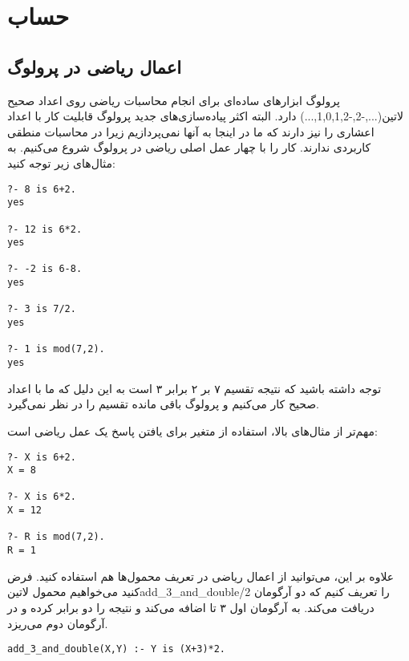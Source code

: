 \chapter{حساب}

\section{اعمال ریاضی در پرولوگ}

پرولوگ ابزارهای ساده‌ای برای انجام محاسبات ریاضی روی اعداد صحیح ‌لاتین{(...,-2,-1,0,1,2,...)} دارد. البته اکثر پیاده‌سازی‌های جدید پرولوگ قابلیت کار با اعداد اعشاری را نیز دارند که ما در اینجا به آنها نمی‌پردازیم زیرا در محاسبات منطقی کاربردی ندارند. کار را با چهار عمل اصلی ریاضی در پرولوگ شروع می‌کنیم. به مثال‌های زیر توجه کنید:

\begin{latin}
\begin{lstlisting}
?- 8 is 6+2.
yes

?- 12 is 6*2.
yes

?- -2 is 6-8.
yes

?- 3 is 7/2.
yes

?- 1 is mod(7,2).
yes
\end{lstlisting}
\end{latin}

توجه داشته باشید که نتیجه تقسیم ۷ بر ۲ برابر ۳ است به این دلیل که ما با اعداد صحیح کار می‌کنیم و پرولوگ باقی مانده تقسیم را در نظر نمی‌گیرد.

مهم‌تر از مثال‌های بالا، استفاده از متغیر برای یافتن پاسخ یک عمل ریاضی است:

\begin{latin}
\begin{lstlisting}
?- X is 6+2.
X = 8

?- X is 6*2.
X = 12

?- R is mod(7,2).
R = 1
\end{lstlisting}
\end{latin}

علاوه بر این، می‌توانید از اعمال ریاضی در تعریف محمول‌ها هم استفاده کنید. فرض کنید می‌خواهیم محمول ‌لاتین{add\_3\_and\_double/2} را تعریف کنیم که دو آرگومان دریافت می‌کند. به آرگومان اول ۳ تا اضافه می‌کند و نتیجه را دو برابر کرده و در آرگومان دوم می‌ریزد.

\begin{latin}
\begin{lstlisting}
add_3_and_double(X,Y) :- Y is (X+3)*2.
\end{lstlisting}
\end{latin}

